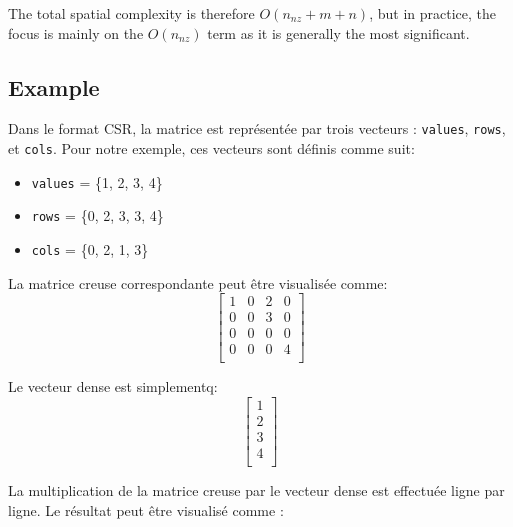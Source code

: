 \documentclass[12pt,oneside]{book} %
\begin{document}
The total spatial complexity is therefore \( O(n_{nz} + m + n) \), but in
practice, the focus is mainly on the \( O(n_{nz}) \) term as it is generally
the most significant.

\newpage
\subsection{Example}

Dans le format CSR, la matrice est représentée par trois vecteurs :
\texttt{values}, \texttt{rows}, et \texttt{cols}. Pour notre exemple, ces
vecteurs sont définis comme suit:
\begin{itemize}
    \item \texttt{values} = \{1, 2, 3, 4\}
    \item \texttt{rows} = \{0, 2, 3, 3, 4\}
    \item \texttt{cols} = \{0, 2, 1, 3\}
\end{itemize}

La matrice creuse correspondante peut être visualisée comme:
\[
    \begin{bmatrix}
        1 & 0 & 2 & 0 \\
        0 & 0 & 3 & 0 \\
        0 & 0 & 0 & 0 \\
        0 & 0 & 0 & 4 \\
    \end{bmatrix}
\]

Le vecteur dense est simplementq:
\[
    \begin{bmatrix}
        1 \\
        2 \\
        3 \\
        4 \\
    \end{bmatrix}
\]

La multiplication de la matrice creuse par le vecteur dense est effectuée ligne
par ligne. Le résultat peut être visualisé comme :
\end{document}
